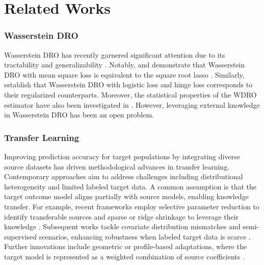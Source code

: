 \section{Related Works}
\subsubsection{Wasserstein DRO}
Wasserstein DRO  has recently garnered significant attention due to its tractability \citep{blanchet2019quantifying, mohajerin2018data, gao2023distributionally} and generalizability \citep{blanchet2019rwpi, gao2022}. Notably, \citet{blanchet2019rwpi} and \citet{gao2022} demonstrate that Wasserstein DRO with mean square loss is equivalent to the square root lasso \cite{belloni2011sqrtlasso}. Similarly, \citet{abadeh2015drologistic, abadeh2019regularizationviamass, blanchet2019rwpi, gao2022} establish that Wasserstein DRO with logistic loss and hinge loss corresponds to their regularized counterparts. Moreover, the statistical properties of the WDRO estimator have also been investigated in \cite{blanchet2021statistical, blanchet2022confidence, gao2023finite}. However, leveraging external knowledge in Wasserstein DRO has been an open problem.

\subsubsection{Transfer Learning}\label{sec:review:tl}
Improving prediction accuracy for target populations by integrating diverse source datasets has driven methodological advances in transfer learning. Contemporary approaches aim to address challenges including distributional heterogeneity and limited labeled target data. A common assumption is that the target outcome model aligns partially with source models, enabling knowledge transfer. For example, recent frameworks employ selective parameter reduction to identify transferable sources and sparse or ridge shrinkage to leverage their knowledge \citep{bastani2020predicting,li2021translasso,tian2023transglm}. Subsequent works tackle covariate distribution mismatches and semi-supervised scenarios, enhancing robustness when labeled target data is scarce \citep{cai2022semi,he2024transfusion,zhou2024Model}. Further innovations include geometric or profile-based adaptations, where the target model is represented as a weighted combination of source coefficients \citep{gu2024angle-based,lin2024profiled}. 

